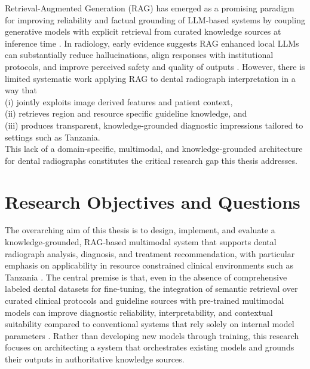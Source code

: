 \documentclass[12pt,a4paper]{report}
\begin{document}
	Retrieval-Augmented Generation (RAG) has emerged as a promising paradigm for improving reliability and factual grounding of LLM-based systems by coupling generative models with explicit retrieval from curated knowledge sources at inference time \cite{lewis2020retrieval,ji2023survey}. In radiology, early evidence suggests RAG enhanced local LLMs can substantially reduce hallucinations, align responses with institutional protocols, and improve perceived safety and quality of outputs \cite{Wada2025RAGRadiology,chatbots_Rajesh_2024}. However, there is limited systematic work applying RAG to dental radiograph interpretation in a way that \\
	(i) jointly exploits image derived features and patient context, \\
	(ii) retrieves region and resource specific guideline knowledge, and \\
	(iii) produces transparent, knowledge-grounded diagnostic impressions tailored to settings such as Tanzania. \\
	This lack of a domain-specific, multimodal, and knowledge-grounded architecture for dental radiographs constitutes the critical research gap this thesis addresses.
	
	
	\section{Research Objectives and Questions}
	\label{sec:objectives}
	
	The overarching aim of this thesis is to design, implement, and evaluate a knowledge-grounded, RAG-based multimodal system that supports dental radiograph analysis, diagnosis, and treatment recommendation, with particular emphasis on applicability in resource constrained clinical environments such as Tanzania \cite{Edward2024OralHealthTZ,inchingolo2025ai_dentistry_review}. The central premise is that, even in the absence of comprehensive labeled dental datasets for fine-tuning, the integration of semantic retrieval over curated clinical protocols and guideline sources with pre-trained multimodal models can improve diagnostic reliability, interpretability, and contextual suitability compared to conventional systems that rely solely on internal model parameters \cite{lewis2020retrieval,huang2023multimodal,schwendicke2022ai_global}. Rather than developing new models through training, this research focuses on architecting a system that orchestrates existing models and grounds their outputs in authoritative knowledge sources.
	
\end{document}
